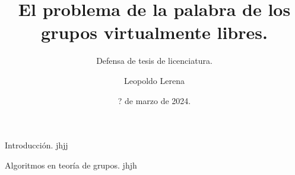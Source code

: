 \documentclass[aspectratio=169, 9pt]{beamer}
\title{El problema de la palabra de los grupos virtualmente libres.}
\subtitle{Defensa de tesis de licenciatura.}
\date{? de marzo de 2024.}
\author{Leopoldo Lerena}
\institute{Universidad de Buenos Aires}
\begin{document}
	\maketitle
	
	\begin{frame}[fragile]{Introducción.}
		jhjj	
	\end{frame}
	
	\begin{frame}[fragile]{Algoritmos en teoría de grupos.}
		jhjh
	\end{frame}
	
	
	
	
	
	
	
	
	
	
	
	
	
	
	
	
\end{document}
